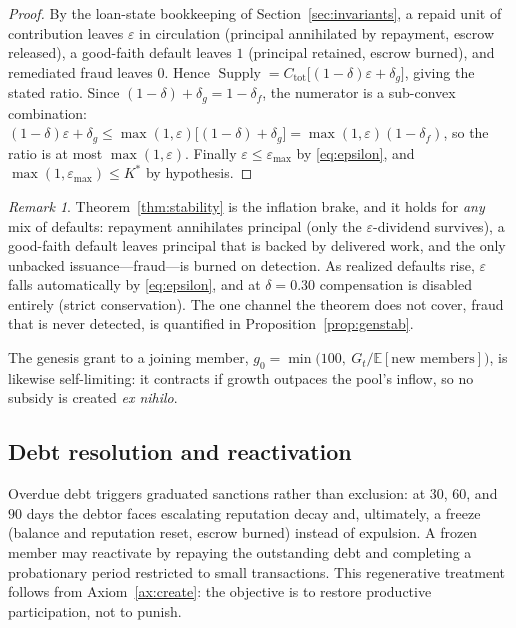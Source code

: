 \documentclass[11pt]{article}
\theoremstyle{plain}
\theoremstyle{definition}
\theoremstyle{remark}
\newtheorem{remark}{Remark}
\newcommand{\Supply}{\operatorname{Supply}}
\begin{document}
\begin{proof}
By the loan-state bookkeeping of Section~\ref{sec:invariants}, a repaid unit of contribution leaves $\varepsilon$ in circulation (principal annihilated by repayment, escrow released), a good-faith default leaves $1$ (principal retained, escrow burned), and remediated fraud leaves $0$. Hence $\Supply = C_{\mathrm{tot}}\bigl[(1-\delta)\varepsilon+\delta_g\bigr]$, giving the stated ratio. Since $(1-\delta)+\delta_g = 1-\delta_f$, the numerator is a sub-convex combination: $(1-\delta)\varepsilon+\delta_g \le \max(1,\varepsilon)\bigl[(1-\delta)+\delta_g\bigr] = \max(1,\varepsilon)(1-\delta_f)$, so the ratio is at most $\max(1,\varepsilon)$. Finally $\varepsilon\le\varepsilon_{\max}$ by \eqref{eq:epsilon}, and $\max(1,\varepsilon_{\max})\le K^*$ by hypothesis.
\end{proof}

\begin{remark}
Theorem~\ref{thm:stability} is the inflation brake, and it holds for \emph{any} mix of defaults: repayment annihilates principal (only the $\varepsilon$-dividend survives), a good-faith default leaves principal that is backed by delivered work, and the only unbacked issuance---fraud---is burned on detection. As realized defaults rise, $\varepsilon$ falls automatically by \eqref{eq:epsilon}, and at $\delta=0.30$ compensation is disabled entirely (strict conservation). The one channel the theorem does not cover, fraud that is never detected, is quantified in Proposition~\ref{prop:genstab}.
\end{remark}

The genesis grant to a joining member, $g_0 = \min\bigl(100,\ G_t/\mathbb{E}[\text{new members}]\bigr)$, is likewise self-limiting: it contracts if growth outpaces the pool's inflow, so no subsidy is created \emph{ex nihilo}.

\subsection{Debt resolution and reactivation}

Overdue debt triggers graduated sanctions rather than exclusion: at $30$, $60$, and $90$ days the debtor faces escalating reputation decay and, ultimately, a freeze (balance and reputation reset, escrow burned) instead of expulsion. A frozen member may reactivate by repaying the outstanding debt and completing a probationary period restricted to small transactions. This regenerative treatment follows from Axiom~\ref{ax:create}: the objective is to restore productive participation, not to punish.
\end{document}
